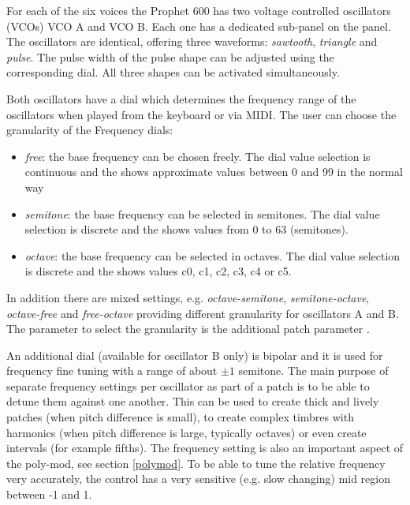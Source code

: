 For each of the six voices the Prophet 600 has two voltage controlled oscillators (VCOs) VCO A and VCO B. Each one has a dedicated sub-panel on the panel. The oscillators are identical, offering three waveforms: \textit{sawtooth}, \textit{triangle} and \textit{pulse}. The pulse width of the pulse shape can be adjusted using the corresponding \pulsewidth dial. All three shapes can be activated simultaneously. 

\begin{center}
\end{center}


Both oscillators have a \oscfreq dial which determines the frequency range of the oscillators when played from the keyboard or via MIDI.  The user can choose the granularity of the Frequency dials: 
\begin{itemize}
  \item \textit{free}: the base frequency can be chosen freely. The dial value selection is continuous and the \display shows approximate values between 0 and 99 in the normal way
  \item \textit{semitone}: the base frequency can be selected in semitones. The dial value selection is discrete and the \display shows values from 0 to 63 (semitones).   
  \item \textit{octave}: the base frequency can be selected in octaves. The dial value selection is discrete and the \display shows values c0, c1, c2, c3, c4 or c5. 
\end{itemize}  
In addition there are mixed settings, e.g. \textit{octave-semitone}, \textit{semitone-octave}, \textit{octave-free} and \textit{free-octave} providing different granularity for oscillators A and B. The parameter to select the granularity is the additional patch parameter \oscpitchmode. 

An additional \freqfine dial (available for oscillator B only) is bipolar and it is used for frequency fine tuning with a range of about $\pm 1$ semitone. The main purpose of separate frequency settings per oscillator as part of a patch is to be able to detune them against one another. This can be used to create thick and lively patches (when pitch difference is small), to create complex timbres with harmonics (when pitch difference is large, typically octaves) or even create intervals (for example fifths). The frequency setting is also an important aspect of the poly-mod, see section \ref{polymod}. To be able to tune the relative frequency very accurately, the \freqfine control has a very sensitive (e.g. slow changing) mid region between -1 and 1.

